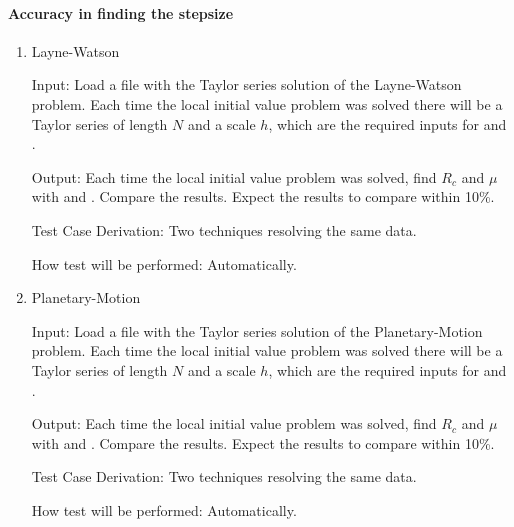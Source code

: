 \documentclass[12pt, titlepage]{article}
\begin{document}
\paragraph{Accuracy in finding the stepsize}

\begin{enumerate}

\item{Layne-Watson \citep{watson1979}\\}

					
					
Input: Load a file with the Taylor series solution of the Layne-Watson problem. Each time the
    local initial value problem was solved there will be a Taylor series of length $N$ and a scale $h$,
    which are the required inputs for  and \rdcon.
					
Output: Each time the local initial value problem was solved, find $R_c$ and $\mu$ with
     and \rdcon. Compare the results. Expect the results to compare within 10\%.

Test Case Derivation: Two techniques resolving the same data.
					
How test will be performed: Automatically.
					
\item{Planetary-Motion \citep{enright1987examples}\\}

					
					
Input: Load a file with the Taylor series solution of the Planetary-Motion problem. Each time the
    local initial value problem was solved there will be a Taylor series of length $N$ and a scale $h$,
    which are the required inputs for  and \rdcon.
					
Output: Each time the local initial value problem was solved, find $R_c$ and $\mu$ with
     and \rdcon. Compare the results. Expect the results to compare within 10\%.

Test Case Derivation: Two techniques resolving the same data.
					
How test will be performed: Automatically.

\end{enumerate}
\end{document}

